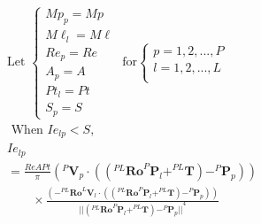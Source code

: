 \begin{description}
        \begin{equation}
            \label{eqn:model_no_lamb}
            \begin{aligned}
                &\text{Let }
                \begin{cases}
                    Mp_p=Mp\\M\ell_l=M\ell\\Re_p=Re\\A_p=A\\Pt_l=Pt\\S_p=S
                \end{cases}
                \text{ for}
                \begin{cases}
                    p = 1,2,...,P\\
                    l = 1,2,...,L\\
                \end{cases}\\
                &\text { When } Ie_{lp}<S ,\\
                &Ie_{lp} \\
                    &= \frac{ReAPt}{ \pi}
                    {( ^{P}\boldsymbol{V}_p \cdot 
                            (
                                (
                                    ^{PL} \boldsymbol{Ro}^{P}\boldsymbol{P}_l
                                    + ^{PL}\boldsymbol{T}
                                )
                                - ^{P}\boldsymbol{P}_p
                            )
                        )}\\
                & \qquad \times
                    \frac{  
                        (
                            -^{PL}\boldsymbol{Ro}^{L}\boldsymbol{V}_l 
                            \cdot 
                            (
                                (
                                    ^{PL}\boldsymbol{Ro}^{P}\boldsymbol{P}_l
                                    +^{PL}\boldsymbol{T}
                                )
                                - ^{P}\boldsymbol{P}_p
                            )
                        )
                    } 
                    {
                        {
                            ||
                                (^{PL}\boldsymbol{Ro}^{P}\boldsymbol{P}_l+^{PL}\boldsymbol{T})
                                - ^{P}\boldsymbol{P}_p
                            ||
                        }^{4}
                    }\\
            \end{aligned}
        \end{equation}


\end{description}
